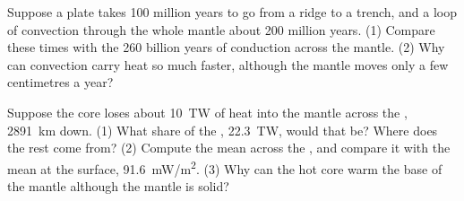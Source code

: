 \begin{exercise}[$\star\star\star$]\label{exo:g12:internal-heat:14}
Suppose a plate takes 100 million years to go from a ridge to a trench, and a
loop of convection through the whole mantle about 200 million years. (1)
Compare these times with the 260 billion years of conduction across the
mantle. (2) Why can convection carry heat so much faster, although the
mantle moves only a few centimetres a year?
\end{exercise}

\begin{exercise}[$\star\star\star$]\label{exo:g12:internal-heat:15}
Suppose the core loses about \qty{10}{TW} of heat into the mantle across
the , \qty{2891}{km} down. (1) What share of the
, \qty{22.3}{TW}, would that be? Where does the rest
come from? (2) Compute the mean  across the
, and compare it with the mean  at the surface,
\qty{91.6}{mW/m^2}. (3) Why can the hot core warm the base of the mantle
although the mantle is solid?
\end{exercise}

